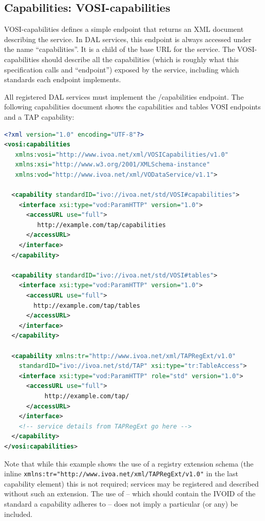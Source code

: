 \documentclass[11pt,letter]{ivoa}
\begin{document}
\subsection{Capabilities: VOSI-capabilities}
\label{sec:vosi-capabilities}
VOSI-capabilities \citep{2017ivoa.spec.0524G} defines a simple endpoint that
returns an XML document
describing the service. In  DAL services, this endpoint is always accessed
under the name
``capabilities''.  It is a child of the base URL for the service. The
VOSI-capabilities should describe all the capabilities (which is roughly
what this specification calls and ``endpoint'') exposed by the service,
including which standards each endpoint implements.

All registered DAL services must implement the /capabilities endpoint. The following
capabilities document shows the capabilities and tables VOSI endpoints
and a TAP capability:

\begin{lstlisting}[language=XML,basicstyle=\footnotesize]
<?xml version="1.0" encoding="UTF-8"?>
<vosi:capabilities
   xmlns:vosi="http://www.ivoa.net/xml/VOSICapabilities/v1.0"
   xmlns:xsi="http://www.w3.org/2001/XMLSchema-instance"
   xmlns:vod="http://www.ivoa.net/xml/VODataService/v1.1">

  <capability standardID="ivo://ivoa.net/std/VOSI#capabilities">
    <interface xsi:type="vod:ParamHTTP" version="1.0">
      <accessURL use="full">
         http://example.com/tap/capabilities
      </accessURL>
    </interface>
  </capability>

  <capability standardID="ivo://ivoa.net/std/VOSI#tables">
    <interface xsi:type="vod:ParamHTTP" version="1.0">
      <accessURL use="full">
        http://example.com/tap/tables
      </accessURL>
    </interface>
  </capability>

  <capability xmlns:tr="http://www.ivoa.net/xml/TAPRegExt/v1.0"
    standardID="ivo://ivoa.net/std/TAP" xsi:type="tr:TableAccess">
    <interface xsi:type="vod:ParamHTTP" role="std" version="1.0">
      <accessURL use="full">
           http://example.com/tap/
      </accessURL>
    </interface>
    <!-- service details from TAPRegExt go here -->
  </capability>
</vosi:capabilities>
\end{lstlisting}

Note that while this example shows the use of a registry extension schema (the
inline \verb|xmlns:tr="http://www.ivoa.net/xml/TAPRegExt/v1.0"| in the last capability
element) this is not required; services may be registered and described without
such an extension. The use of  -- which should contain the
IVOID of
the standard a capability adheres to -- does not imply a particular (or any)
 be included.
\end{document}
